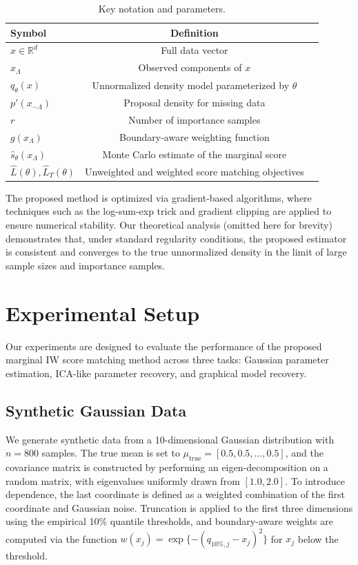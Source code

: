 \documentclass{article}
\begin{document}
\begin{table}[h]
\centering
\begin{tabular}{lcl}
\hline
\textbf{Symbol} & \textbf{Definition} \\
\hline
$x\in\mathbb{R}^d$ & Full data vector \\
$x_\Lambda$ & Observed components of $x$ \\
$q_\theta(x)$ & Unnormalized density model parameterized by $\theta$ \\
$p'(x_{-\Lambda})$ & Proposal density for missing data \\
$r$ & Number of importance samples \\
$g(x_\Lambda)$ & Boundary-aware weighting function \\
$\hat{s}_{\theta}(x_\Lambda)$ & Monte Carlo estimate of the marginal score \\
$\hat{L}(\theta),\hat{L}_T(\theta)$ & Unweighted and weighted score matching objectives \\
\hline
\end{tabular}
\caption{Key notation and parameters.}
\label{tab:methods}
\end{table}

The proposed method is optimized via gradient-based algorithms, where techniques such as the log-sum-exp trick and gradient clipping are applied to ensure numerical stability. Our theoretical analysis (omitted here for brevity) demonstrates that, under standard regularity conditions, the proposed estimator is consistent and converges to the true unnormalized density in the limit of large sample sizes and importance samples.

\section{Experimental Setup}
Our experiments are designed to evaluate the performance of the proposed marginal IW score matching method across three tasks: Gaussian parameter estimation, ICA-like parameter recovery, and graphical model recovery.

\subsection{Synthetic Gaussian Data}
We generate synthetic data from a 10-dimensional Gaussian distribution with $n=800$ samples. The true mean is set to $\mu_{\text{true}}=[0.5,0.5,\dots,0.5]$, and the covariance matrix is constructed by performing an eigen-decomposition on a random matrix, with eigenvalues uniformly drawn from $[1.0,2.0]$. To introduce dependence, the last coordinate is defined as a weighted combination of the first coordinate and Gaussian noise. Truncation is applied to the first three dimensions using the empirical 10\% quantile thresholds, and boundary-aware weights are computed via the function $w(x_j)=\exp\{- (q_{10\%,j}-x_j)^2\}$ for $x_j$ below the threshold.
\end{document}
